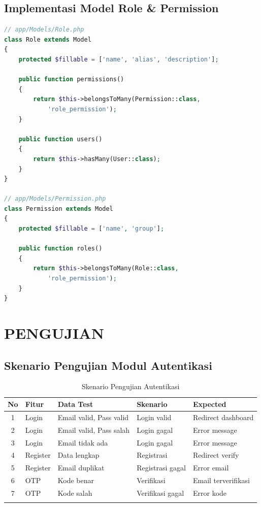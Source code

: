 \documentclass[12pt,a4paper]{article}
\begin{document}
\subsection{Implementasi Model Role \& Permission}
\begin{lstlisting}[language=PHP]
// app/Models/Role.php
class Role extends Model
{
    protected $fillable = ['name', 'alias', 'description'];

    public function permissions()
    {
        return $this->belongsToMany(Permission::class, 
            'role_permission');
    }

    public function users()
    {
        return $this->hasMany(User::class);
    }
}

// app/Models/Permission.php
class Permission extends Model
{
    protected $fillable = ['name', 'group'];

    public function roles()
    {
        return $this->belongsToMany(Role::class, 
            'role_permission');
    }
}
\end{lstlisting}

\newpage

\section{PENGUJIAN}

\subsection{Skenario Pengujian Modul Autentikasi}
\begin{longtable}{|c|l|p{3cm}|p{3cm}|p{3cm}|}
\hline
\textbf{No} & \textbf{Fitur} & \textbf{Data Test} & \textbf{Skenario} & \textbf{Expected} \\
\hline
\endfirsthead
1 & Login & Email valid, Pass valid & Login valid & Redirect dashboard \\
2 & Login & Email valid, Pass salah & Login gagal & Error message \\
3 & Login & Email tidak ada & Login gagal & Error message \\
4 & Register & Data lengkap & Registrasi & Redirect verify \\
5 & Register & Email duplikat & Registrasi gagal & Error email \\
6 & OTP & Kode benar & Verifikasi & Email terverifikasi \\
7 & OTP & Kode salah & Verifikasi gagal & Error kode \\
\hline
\caption{Skenario Pengujian Autentikasi}
\end{longtable}
\end{document}
